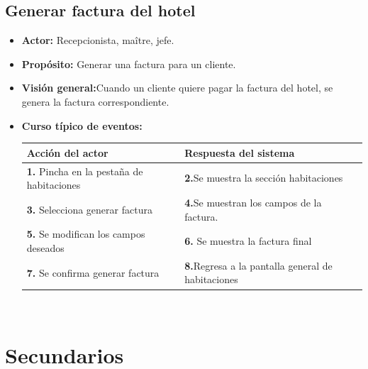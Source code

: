 \documentclass[spanish,a4paper,12pt]{report}	%
\begin{document}
	\subsection{Generar factura del hotel}
		\begin{itemize}
			\item \textbf{Actor:} Recepcionista, maître, jefe.
			\item \textbf{Propósito: } Generar una factura para un cliente.
			\item \textbf{Visión general:}Cuando un cliente quiere pagar la factura del hotel, se genera la factura correspondiente.
			\item \textbf{Curso típico de eventos:} 	\\
				\begin{tabular}{|p{6cm}||p{6cm}|}
				\hline
				\textbf{Acción del actor} & \textbf{Respuesta del sistema} \\ \hline
				\textbf{1.} Pincha en la pestaña de habitaciones & \textbf{2.}Se muestra la sección habitaciones \\ \hline 
				\textbf{3.} Selecciona generar factura & \textbf{4.}Se muestran los campos de la factura.  \\ \hline
				\textbf{5.} Se modifican los campos deseados & \textbf{6.} Se muestra la factura final \\ \hline
				\textbf{7.} Se confirma generar factura & \textbf{8.}Regresa a la pantalla general de habitaciones\\ \hline
			\end{tabular}
			\\
		\end {itemize}

\newpage

\section{Secundarios}	

\end{document}
